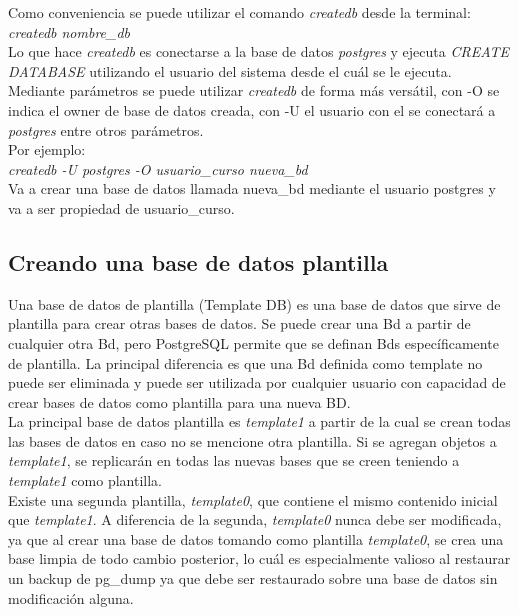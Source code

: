 Como conveniencia se puede utilizar el comando \textit{createdb} desde la terminal:\\

\textit{createdb nombre\_db}\\

Lo que hace \textit{createdb} es conectarse a la base de datos \textit{postgres} y ejecuta \textit{CREATE DATABASE} utilizando el usuario del sistema desde el cuál se le ejecuta.\\

Mediante parámetros se puede utilizar \textit{createdb} de forma más versátil, con -O se indica el owner de base de datos creada, con -U el usuario con el se conectará a \textit{postgres} entre otros parámetros.\\

Por ejemplo:\\

\textit{createdb -U postgres -O usuario\_curso nueva\_bd}\\

Va a crear una base de datos llamada nueva\_bd mediante el usuario postgres y va a ser propiedad de usuario\_curso.

\subsection{Creando una base de datos plantilla}

Una base de datos de plantilla (Template DB) es una base de datos que sirve de plantilla para crear otras bases de datos. Se puede crear una Bd a partir de cualquier otra Bd, pero PostgreSQL permite que se definan Bds específicamente de plantilla. La principal diferencia es que una Bd definida como template no puede ser eliminada y puede ser utilizada por cualquier usuario con capacidad de crear bases de datos como plantilla para una nueva BD.\\

La principal base de datos plantilla es \textit{template1} a partir de la cual se crean todas las bases de datos en caso no se mencione otra plantilla. Si se agregan objetos a \textit{template1}, se replicarán en todas las nuevas bases que se creen teniendo a \textit{template1} como plantilla.\\

Existe una segunda plantilla, \textit{template0}, que contiene el mismo contenido inicial que \textit{template1}. A diferencia de la segunda, \textit{template0} nunca debe ser modificada, ya que al crear una base de datos tomando como plantilla \textit{template0}, se crea una base limpia de todo cambio posterior, lo cuál es especialmente valioso al restaurar un backup de pg\_dump ya que debe ser restaurado sobre una base de datos sin modificación alguna.\\

